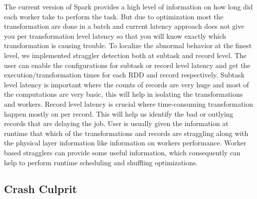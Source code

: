 \documentclass{acm_proc_article-sp}
\begin{document}
The current version of Spark provides a high level of information on how long did each worker take to perform the task. But due to optimization most the transformation are done in a batch and current latency approach does not give you per transformation level latency so that you will know exactly which transformation is causing trouble. To localize the abnormal behavior at the finest level, we implemented straggler detection both at subtask and record level. The user can enable the configurations for subtask or record level latency and get the execution/transformation times for each RDD and record respectively. Subtask level latency is important where the counts of records are very huge and most of the computations are very basic, this will help in isolating the transformations and workers. Record level latency is crucial where time-consuming transformation happen mostly on per record. This will help us identify the bad or outlying records that are delaying the job. User is usually given the information at runtime that which of the transformations and records are straggling along with the physical layer information like information on workers performance. Worker based stragglers can provide some useful information, which consequently can help to perform runtime scheduling and shuffling optimizations.

\subsection{Crash Culprit}
\end{document}
